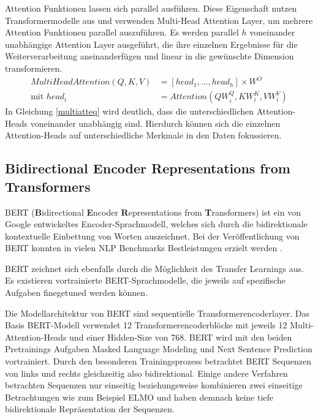 \pagebreak
Attention Funktionen lassen sich parallel ausführen. Diese Eigenschaft nutzen Transformermodelle aus und verwenden Multi-Head Attention Layer, um mehrere Attention Funktionen parallel auszuführen.
Es werden parallel $h$ voneinander unabhängige Attention Layer ausgeführt, die ihre einzelnen Ergebnisse für die Weiterverarbeitung aneinanderfügen und linear in die gewünschte Dimension transformieren. 
\begin{equation}
    \label{multiatteq}
    \begin{split}
    MultiHeadAttention(Q,K,V) &= [head_1, \ldots, head_h] \times W^{O} \\
    \text{mit } head_i &= Attention(QW_i^Q,KW_i^K,VW_i^V)
    \end{split}
\end{equation}
In Gleichung \ref{multiatteq} wird deutlich, dass die unterschiedlichen Attention-Heads voneinander unabhängig sind. Hierdurch können sich die einzelnen Attention-Heads auf unterschiedliche Merkmale in den Daten fokussieren.



    


\subsection{\textbf{B}idirectional \textbf{E}ncoder \textbf{R}epresentations from \textbf{T}ransformers}
BERT (\textbf{B}idirectional \textbf{E}ncoder \textbf{R}epresentations from \textbf{T}ransformers) ist ein von Google \citep{DBLP:journals/corr/abs-1810-04805} entwickeltes Encoder-Sprachmodell, welches sich durch die bidirektionale kontextuelle Einbettung von Worten auszeichnet.
Bei der Veröffentlichung von BERT konnten in vielen NLP Benchmarks Bestleistungen erzielt werden \citep{DBLP:journals/corr/abs-1810-04805}. 

BERT zeichnet sich ebenfalls durch die Möglichkeit des Transfer Learnings aus. Es existieren vortrainierte BERT-Sprachmodelle, die jeweils auf spezifische Aufgaben finegetuned werden können.

Die Modellarchitektur von BERT sind sequentielle Transformerencoderlayer. Das Basis BERT-Modell verwendet 12 Transformerencoderblöcke mit jeweils 12 Multi-Attention-Heads und einer Hidden-Size von 768.
BERT wird mit den beiden Pretrainings Aufgaben Masked Language Modeling und Next Sentence Prediction vortrainiert. Durch den besonderen Trainingsprozess betrachtet BERT Sequenzen von links und rechts gleichzeitig also bidirektional. Einige andere Verfahren betrachten Sequenzen nur einseitig beziehungsweise kombinieren zwei einseitige Betrachtungen wie zum Beispiel ELMO \citep{elmo} und haben demnach keine tiefe bidirektionale Repräsentation der Sequenzen.


